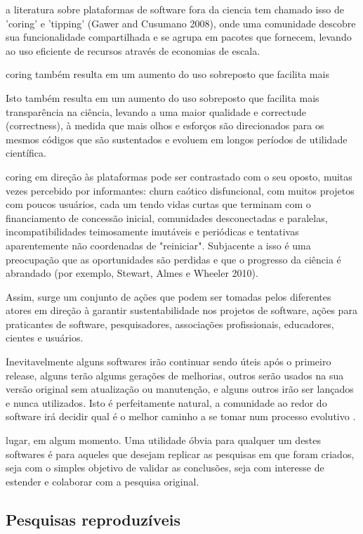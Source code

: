 a literatura sobre plataformas de software fora da ciencia tem chamado isso de
'coring' e 'tipping' (Gawer and Cusumano 2008),
onde uma comunidade descobre sua funcionalidade compartilhada e se agrupa
em pacotes que fornecem, levando ao uso eficiente de recursos através de
economias de escala.

coring também resulta em um aumento do uso sobreposto que facilita mais

Isto também resulta em um aumento do uso sobreposto que facilita mais
transparência na ciência, levando a uma maior qualidade e correctude (correctness), à medida
que mais olhos e esforços são direcionados para os mesmos códigos que são
sustentados e evoluem em longos períodos de utilidade científica.

coring em direção às plataformas pode ser contrastado com o seu oposto, muitas
vezes percebido por informantes: churn caótico disfuncional, com muitos
projetos com poucos usuários, cada um tendo vidas curtas que terminam com o
financiamento de concessão inicial, comunidades desconectadas e paralelas,
incompatibilidades teimosamente imutáveis e periódicas e tentativas
aparentemente não coordenadas de "reiniciar". Subjacente a isso é uma
preocupação que as oportunidades são perdidas e que o progresso da ciência é
abrandado (por exemplo, Stewart, Almes e Wheeler 2010).

Assim, surge um conjunto de ações que podem ser tomadas pelos diferentes atores
em direção à garantir sustentabilidade nos projetos de software, ações para
praticantes de software, pesquisadores, associações profissionais, educadores,
cientes e usuários.

Inevitavelmente alguns softwares irão continuar sendo úteis após o primeiro
release, alguns terão algums gerações de melhorias, outros serão usados na sua
versão original sem atualização ou manutenção, e alguns outros irão ser
lançados e nunca utilizados. Isto é perfeitamente natural, a comunidade ao
redor do software irá decidir qual é o melhor caminho a se tomar num processo
evolutivo \cite{weiner2009astronomical}.

lugar, em algum momento. Uma utilidade óbvia para qualquer um destes softwares
é para aqueles que desejam replicar as pesquisas em que foram criados, seja com
o simples objetivo de validar as conclusões, seja com interesse de estender e
colaborar com a pesquisa original.

\subsection{Pesquisas reproduzíveis}

